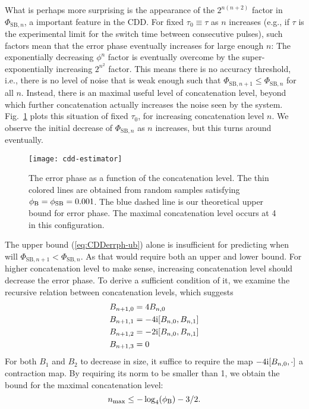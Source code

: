 \documentclass[pra,reprint,superscriptaddress]{revtex4-2}
\begin{document}
What is perhaps more surprising is the appearance of the $2^{n(n+2)}$ factor in $\Phi_{\mathrm{SB},n}$, a important feature in the CDD. For fixed $\tau_0\equiv \tau$ as $n$ increases (e.g., if $\tau$ is the experimental limit for the switch time between consecutive pulses), such factors mean that the error phase eventually increases for large enough $n$: The exponentially decreasing $\phi^n$ factor is eventually overcome by the super-exponentially increasing $2^{n^2}$ factor. This means there is no accuracy threshold, i.e., there is no level of noise that is weak enough such that $\Phi_{\mathrm{SB},n+1}\leq\Phi_{\mathrm{SB},n}$ for all $n$. Instead, there is an maximal useful level of concatenation level, beyond which further concatenation actually increases the noise seen by the system. Fig.~\ref{fig:estimator-size} plots this situation of fixed $\tau_0$, for increasing concatenation level $n$. We observe the initial decrease of $\Phi_{\mathrm{SB},n}$ as $n$ increases, but this turns around eventually. 

\begin{figure}
    \texttt{[image: cdd-estimator]}
    \caption{The error phase as a function of the concatenation level. 
    The thin colored lines are obtained from random samples satisfying $\phi_{\mathrm{B}}=\phi_{\mathrm{SB}}=0.001$. The blue dashed line is our theoretical upper bound for error phase. The maximal concatenation level occurs at 4 in this configuration.}
    \label{fig:estimator-size}
\end{figure}

The upper bound (\ref{eq:CDDerrph-ub}) alone is insufficient 
for predicting when will $\Phi_{\mathrm{SB},n+1} < \Phi_{\mathrm{SB},n} $. As that would require both an upper and lower bound. 
For higher concatenation level to make sense, increasing concatenation level should decrease the error phase. To derive a sufficient condition of it, we examine the recursive relation between concatenation 
levels, which suggests 
\begin{equation}\label{eq:cdd-update}
\begin{aligned}
 B_{n+1,0} &= 4  B_{n,0}\\
 B_{n+1,1} & = -4\mathrm{i} [B_{n,0}, B_{n,1} ]\\
 B_{n+1,2} & = -2\mathrm{i} [B_{n,0}, B_{n,1} ]\\
  B_{n+1,3} &=0
\end{aligned}
\end{equation}
For both $B_1$ and $B_2$ to decrease in size, it suffice to require the map 
$-4\mathrm{i} [B_{n,0},\cdot]$ a contraction map. 
By requiring its norm to be smaller than 1, we obtain the bound for the maximal concatenation level:
\begin{equation}\label{eq:cdd-max-level}
n_{\max}\le -\log_4(\phi_{\mathrm{B}})-3/2.
\end{equation}
\end{document}
